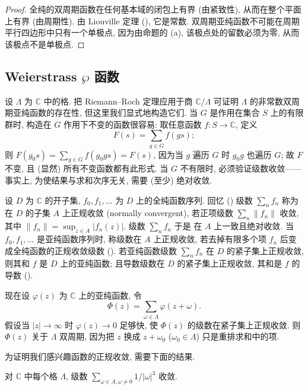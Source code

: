 \begin{proof}
全纯的双周期函数在任何基本域的闭包上有界 (由紧致性), 从而在整个平面上有界 (由周期性). 由 Liouville 定理 (\cite[III, 1.2]{cartan1963}), 它是常数. 双周期亚纯函数不可能在周期平行四边形中只有一个单极点, 因为由命题的 (a), 该极点处的留数必须为零, 从而该极点不是单极点.
\end{proof}

\subsection*{Weierstrass $\wp$ 函数}

设 $\Lambda$ 为 $\mathbb{C}$ 中的格. 把 Riemann--Roch 定理应用于商 $\mathbb{C}/\Lambda$ 可证明 $\Lambda$ 的非常数双周期亚纯函数的存在性, 但这里我们显式地构造它们. 当 $G$ 是作用在集合 $S$ 上的有限群时, 构造在 $G$ 作用下不变的函数很容易: 取任意函数 $f\colon S\to\mathbb{C}$, 定义
\[
F(s) = \sum\limits_{g\in G} f(gs);
\]
则 $F(g_0s) = \sum\limits_{g\in G} f(g_0gs) = F(s)$, 因为当 $g$ 遍历 $G$ 时 $g_0g$ 也遍历 $G$; 故 $F$ 不变, 且 (显然) 所有不变函数都有此形式. 当 $G$ 不有限时, 必须验证级数收敛——事实上, 为使结果与求和次序无关, 需要 (至少) 绝对收敛.

设 $D$ 为 $\mathbb{C}$ 的开子集, $f_0, f_1, \dots$ 为 $D$ 上的全纯函数序列. 回忆 (\cite[I, 2]{cartan1963}) 级数 $\sum\limits_n f_n$ 称为在 $D$ 的子集 $A$ 上正规收敛 (normally convergent), 若正项级数 $\sum\limits_n\|f_n\|$ 收敛, 其中 $\|f_n\| = \sup_{z\in A}|f_n(z)|$. 级数 $\sum\limits_n f_n$ 于是 在 $A$ 上一致且绝对收敛. 当 $f_0, f_1, \dots$ 是亚纯函数序列时, 称级数在 $A$ 上正规收敛, 若去掉有限多个项 $f_n$ 后变成全纯函数的正规收敛级数 (\cite[V, 2]{cartan1963}). 若亚纯函数级数 $\sum\limits_n f_n$ 在 $D$ 的紧子集上正规收敛, 则其和 $f$ 是 $D$ 上的亚纯函数; 且导数级数在 $D$ 的紧子集上正规收敛, 其和是 $f$ 的导数 (\cite[V, 2]{cartan1963}).

现在设 $\varphi(z)$ 为 $\mathbb{C}$ 上的亚纯函数, 令
\[
\Phi(z) = \sum\limits_{\omega\in\Lambda}\varphi(z+\omega).
\]
假设当 $|z|\to\infty$ 时 $\varphi(z)\to 0$ 足够快, 使 $\Phi(z)$ 的级数在紧子集上正规收敛. 则 $\Phi(z)$ 关于 $\Lambda$ 双周期, 因为把 $z$ 换成 $z+\omega_0$ ($\omega_0\in\Lambda$) 只是重排求和中的项.

为证明我们感兴趣函数的正规收敛, 需要下面的结果.

\begin{lemma} \label{thm:3.2.3} 
对 $\mathbb{C}$ 中每个格 $\Lambda$, 级数 $\sum\limits_{\omega\in\Lambda, \omega\neq 0}1/|\omega|^3$ 收敛.
\end{lemma}

